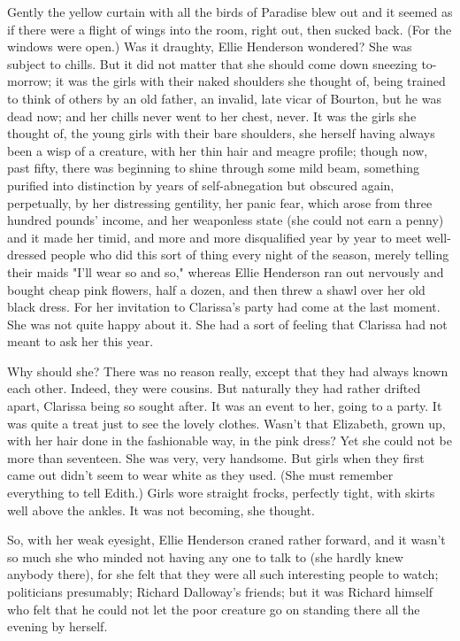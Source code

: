 \documentclass[lang=cn,10pt]{elegantbook}
\begin{document}
Gently the yellow curtain with all the birds of Paradise blew out
and it seemed as if there were a flight of wings into the room,
right out, then sucked back.  (For the windows were open.)  Was it
draughty, Ellie Henderson wondered?  She was subject to chills.
But it did not matter that she should come down sneezing to-morrow;
it was the girls with their naked shoulders she thought of, being
trained to think of others by an old father, an invalid, late vicar
of Bourton, but he was dead now; and her chills never went to her
chest, never.  It was the girls she thought of, the young girls
with their bare shoulders, she herself having always been a wisp of
a creature, with her thin hair and meagre profile; though now, past
fifty, there was beginning to shine through some mild beam,
something purified into distinction by years of self-abnegation but
obscured again, perpetually, by her distressing gentility, her
panic fear, which arose from three hundred pounds' income, and her
weaponless state (she could not earn a penny) and it made her
timid, and more and more disqualified year by year to meet well-
dressed people who did this sort of thing every night of the
season, merely telling their maids "I'll wear so and so," whereas
Ellie Henderson ran out nervously and bought cheap pink flowers,
half a dozen, and then threw a shawl over her old black dress.  For
her invitation to Clarissa's party had come at the last moment.
She was not quite happy about it.  She had a sort of feeling that
Clarissa had not meant to ask her this year.

Why should she?  There was no reason really, except that they had
always known each other.  Indeed, they were cousins.  But naturally
they had rather drifted apart, Clarissa being so sought after.  It
was an event to her, going to a party.  It was quite a treat just
to see the lovely clothes.  Wasn't that Elizabeth, grown up, with
her hair done in the fashionable way, in the pink dress?  Yet she
could not be more than seventeen.  She was very, very handsome.
But girls when they first came out didn't seem to wear white as
they used.  (She must remember everything to tell Edith.)  Girls
wore straight frocks, perfectly tight, with skirts well above the
ankles.  It was not becoming, she thought.

So, with her weak eyesight, Ellie Henderson craned rather forward,
and it wasn't so much she who minded not having any one to talk to
(she hardly knew anybody there), for she felt that they were all
such interesting people to watch; politicians presumably; Richard
Dalloway's friends; but it was Richard himself who felt that he
could not let the poor creature go on standing there all the
evening by herself.
\end{document}
